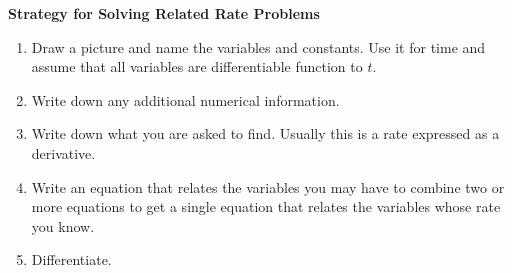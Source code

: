 \documentclass[11pt,a4paper]{article}
\begin{document}
\textbf{Strategy for Solving Related Rate Problems}
\begin{enumerate}
\item Draw a picture and name the variables and constants. Use it for time and assume that all variables are differentiable function to $t$.
\item Write down any additional numerical information.
\item Write down what you are asked to find. Usually this is a rate expressed as a derivative.
\item Write an equation that relates the variables you may have to combine two or more equations to get a single equation that relates the variables whose rate you know.
\item Differentiate.\\\\
\end{enumerate}
\end{document}
